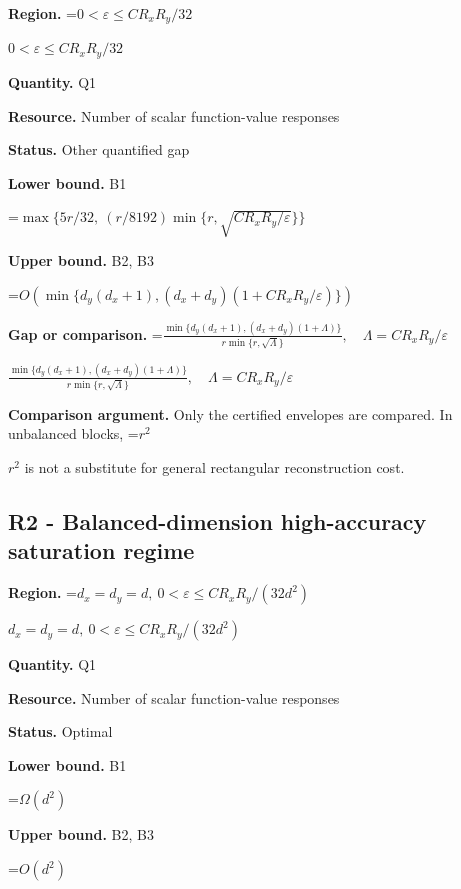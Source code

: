 \documentclass[10pt,a4paper]{article}
\newcommand{\AtlasMath}[1]{\par\begingroup\centering\setbox0=\hbox{$\displaystyle #1$}\ifdim\wd0>1.4\linewidth\typeout{ATLAS WIDE FORMULA: \the\wd0}\fi\ifdim\wd0>\linewidth\resizebox{\linewidth}{!}{\box0}\else\box0\fi\par\endgroup}
\newcommand{\AtlasInlineMath}[1]{\begingroup\setbox0=\hbox{$#1$}\ifdim\wd0>.4\linewidth\endgroup\AtlasMath{#1}\else\endgroup$#1$\fi}
\begin{document}
\textbf{Region.} \AtlasInlineMath{0<\varepsilon\le CR_xR_y/32}



\textbf{Quantity.} Q1



\textbf{Resource.} Number of scalar function-value responses



\textbf{Status.} Other quantified gap



\textbf{Lower bound.} B1



\AtlasMath{\max\{5r/32,\ (r/8192)\min\{r,\sqrt{CR_xR_y/\varepsilon}\}\}}


\textbf{Upper bound.} B2, B3



\AtlasMath{O(\min\{d_y(d_x+1),(d_x+d_y)(1+CR_xR_y/\varepsilon)\})}


\textbf{Gap or comparison.} \AtlasInlineMath{\frac{\min\{d_y(d_x+1),(d_x+d_y)(1+\Lambda)\}}{r\min\{r,\sqrt\Lambda\}},\quad\Lambda=CR_xR_y/\varepsilon}



\textbf{Comparison argument.} Only the certified envelopes are compared. In unbalanced blocks, \AtlasInlineMath{r^2} is not a substitute for general rectangular reconstruction cost.



\subsection{R2 - Balanced-dimension high-accuracy saturation regime}


\textbf{Region.} \AtlasInlineMath{d_x=d_y=d,\ 0<\varepsilon\le CR_xR_y/(32d^2)}



\textbf{Quantity.} Q1



\textbf{Resource.} Number of scalar function-value responses



\textbf{Status.} Optimal



\textbf{Lower bound.} B1



\AtlasMath{\Omega(d^2)}


\textbf{Upper bound.} B2, B3



\AtlasMath{O(d^2)}
\end{document}
